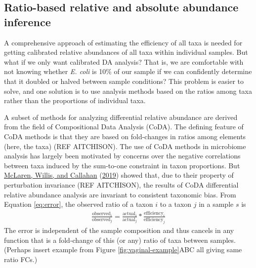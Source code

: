 \documentclass[
]{article}
\theoremstyle{definition}
\theoremstyle{definition}
\theoremstyle{definition}
\theoremstyle{definition}
\theoremstyle{remark}
\begin{document}
\hypertarget{ratio-based-relative-and-absolute-abundance-inference}{%
\subsection{Ratio-based relative and absolute abundance inference}\label{ratio-based-relative-and-absolute-abundance-inference}}

A comprehensive approach of estimating the efficiency of all taxa is needed for getting calibrated relative abundances of all taxa within individual samples.
But what if we only want calibrated DA analysis?
That is, we are comfortable with not knowing whether \emph{E. coli} is 10\% of our sample if we can confidently determine that it doubled or halved between sample conditions?
This problem is easier to solve, and one solution is to use analysis methods based on the ratios among taxa rather than the proportions of individual taxa.

A subset of methods for analyzing differential relative abundance are derived from the field of Compositional Data Analysis (CoDA).
The defining feature of CoDA methods is that they are based on fold-changes in ratios among elements (here, the taxa) (REF AITCHISON).
The use of CoDA methods in microbiome analysis has largely been motivated by concerns over the negative correlations between taxa induced by the sum-to-one constraint in taxon proportions.
But \protect\hyperlink{ref-mclaren2019cons}{McLaren, Willis, and Callahan} (\protect\hyperlink{ref-mclaren2019cons}{2019}) showed that, due to their property of perturbation invariance (REF AITCHISON), the results of CoDA differential relative abundance analysis are invariant to consistent taxonomic bias.
From Equation \eqref{eq:error}, the observed ratio of a taxon \(i\) to a taxon \(j\) in a sample \(s\) is
\begin{align}
  \frac{\text{observed}_{i}}{\text{observed}_{j}}=\frac{\text{actual}_{i}}{\text{actual}_{j}}*\frac{\text{efficiency}_{i}}{\text{efficiency}_{j}}
\end{align}
The error is independent of the sample composition and thus cancels in any function that is a fold-change of this (or any) ratio of taxa between samples.
(Perhaps insert example from Figure \ref{fig:vaginal-example}ABC all giving same ratio FCs.)
\end{document}
